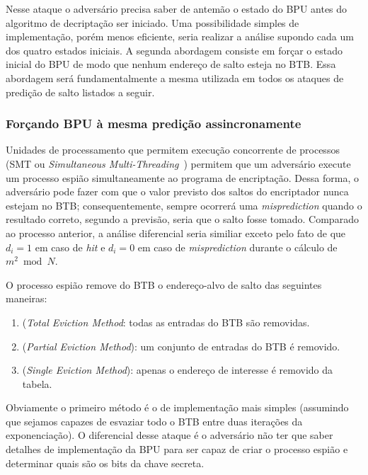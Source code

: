 \documentclass{SBCbookchapter}
\begin{document}
Nesse ataque o advers\'{a}rio precisa saber de antem\~{a}o o estado do BPU antes do algoritmo de decripta\c{c}\~{a}o ser iniciado. Uma possibilidade simples de  implementa\c{c}\~{a}o, por\'{e}m menos eficiente, seria realizar a an\'{a}lise supondo cada um dos quatro estados iniciais. A segunda abordagem consiste em for\c{c}ar o estado inicial do BPU de modo que nenhum endere\c{c}o de salto esteja no BTB. Essa abordagem ser\'{a} fundamentalmente a mesma utilizada em todos os ataques de predi\c{c}\~{a}o de salto listados a seguir.

\subsubsection{For\c{c}ando BPU \`{a} mesma predi\c{c}\~{a}o assincronamente}

Unidades de processamento que permitem execu\c{c}\~{a}o concorrente de processos (SMT ou \textit{Simultaneous Multi-Threading}~\cite{Silberschatz2004}) permitem que um advers\'{a}rio execute um processo espi\~{a}o simultaneamente ao programa de encripta\c{c}\~{a}o. Dessa forma, o advers\'{a}rio pode fazer com que o valor previsto dos saltos do encriptador nunca estejam no BTB; conseq{u}entemente, sempre ocorrer\'{a} uma \textit{misprediction} quando o resultado correto, segundo a previs\~{a}o, seria que o salto fosse tomado. Comparado ao processo anterior, a an\'{a}lise diferencial seria similiar exceto pelo fato de que $d_{i} = 1$ em caso de \textit{hit} e $d_{i} = 0$ em caso de \textit{misprediction} durante o c\'{a}lculo de $m^{2} \bmod N$.

O processo espi\~{a}o remove do BTB o endere\c{c}o-alvo de salto das seguintes maneiras:
\begin{enumerate}
	\item (\textit{Total Eviction Method}: todas as entradas do BTB s\~{a}o removidas.
	\item (\textit{Partial Eviction Method}): um conjunto de entradas do BTB \'{e} removido.
	\item (\textit{Single Eviction Method}): apenas o endere\c{c}o de interesse \'{e} removido da tabela.
\end{enumerate}

Obviamente o primeiro m\'{e}todo \'{e} o de implementa\c{c}\~{a}o mais simples (assumindo que sejamos capazes de esvaziar todo o BTB entre duas itera\c{c}\~{o}es da exponencia\c{c}\~{a}o). O diferencial desse ataque \'{e} o advers\'{a}rio n\~{a}o ter que saber detalhes de implementa\c{c}\~{a}o da BPU para ser capaz de criar o processo espi\~{a}o e determinar quais s\~{a}o os bits da chave secreta.
\end{document}
